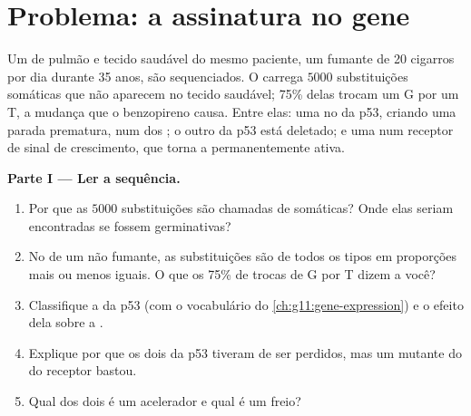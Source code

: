 \section{Problema: a assinatura no gene}

\begin{problem}
\label{pb:g11:cancer:1}
Um  de pulmão e tecido saudável do mesmo paciente, um fumante de
20 cigarros por dia durante 35 anos, são sequenciados. O  carrega
$\num{5000}$ substituições somáticas que não aparecem no tecido
saudável; 75\% delas trocam um G por um T, a mudança que o benzopireno
causa. Entre elas: uma no  da p53, criando uma parada prematura, num
dos ; o outro  da p53 está deletado; e uma num  receptor
de sinal de crescimento, que torna a  permanentemente ativa.

\medskip
\noindent\textbf{Parte I --- Ler a sequência.}
\begin{enumerate}
  \item Por que as $\num{5000}$ substituições são chamadas de
        somáticas? Onde elas seriam encontradas se fossem germinativas?
  \item No  de um não fumante, as substituições são de todos os
        tipos em proporções mais ou menos iguais. O que os 75\% de
        trocas de G por T dizem a você?
  \item Classifique a  da p53 (com o vocabulário do
        \cref{ch:g11:gene-expression}) e o efeito dela sobre a .
  \item Explique por que os dois  da p53 tiveram de ser
        perdidos, mas um  mutante do  do receptor bastou.
  \item Qual dos dois  é um acelerador e qual é um freio?
\end{enumerate}


\end{problem}
